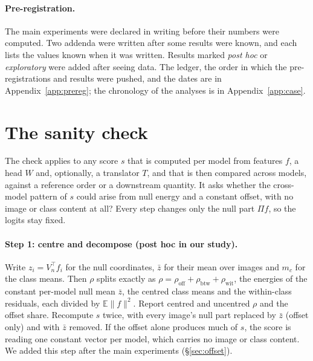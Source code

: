 \documentclass[10pt]{article}
\begin{document}
\paragraph{Pre-registration.}
The main experiments were declared in writing before their numbers were computed. Two addenda were written after some results were known, and each lists the values known when it was written. Results marked \emph{post hoc} or \emph{exploratory} were added after seeing data. The ledger, the order in which the pre-registrations and results were pushed, and the dates are in Appendix~\ref{app:prereg}; the chronology of the analyses is in Appendix~\ref{app:case}.
\section{The sanity check}
\label{sec:check}
The check applies to any score $s$ that is computed per model from features $f$, a head $W$ and, optionally, a translator $T$, and that is then compared across models, against a reference order or a downstream quantity.
It asks whether the cross-model pattern of $s$ could arise from null energy and a constant offset, with no image or class content at all?
Every step changes only the null part $\Pi f$, so the logits stay fixed.

\paragraph{Step 1: centre and decompose (post hoc in our study).}
Write $z_i=V_n^\top f_i$ for the null coordinates, $\bar z$ for their mean over images and $m_c$ for the class means. Then $\rho$ splits exactly as $\rho=\rho_{\mathrm{off}}+\rho_{\mathrm{btw}}+\rho_{\mathrm{wit}}$, the energies of the constant per-model null mean $\bar z$, the centred class means and the within-class residuals, each divided by $\mathbb{E}\|f\|^2$. Report centred and uncentred $\rho$ and the offset share. Recompute $s$ twice, with every image's null part replaced by $\bar z$ (offset only) and with $\bar z$ removed. If the offset alone produces much of $s$, the score is reading one constant vector per model, which carries no image or class content. We added this step after the main experiments (\S\ref{sec:offset}).
\end{document}
